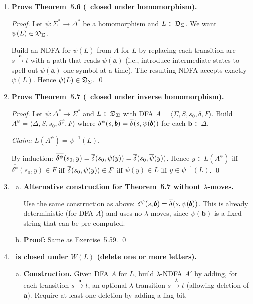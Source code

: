 \begin{enumerate}[{5.}1. ]
\item \textbf{Prove Theorem~5.6 (\DSIG\ closed under homomorphism).}

\begin{proof}
Let $\psi:\Sigma^*\to\Delta^*$ be a homomorphism and $L\in\mathfrak{D}_\Sigma$.  We want $\psi(L)\in\mathfrak{D}_\Sigma$.

Build an NDFA for $\psi(L)$ from $A$ for $L$ by replacing each transition arc $s\xrightarrow{\pmb{a}}t$ with a path that reads $\psi(\pmb{a})$ (i.e., introduce intermediate states to spell out $\psi(\pmb{a})$ one symbol at a time).  The resulting NDFA accepts exactly $\psi(L)$.  Hence $\psi(L)\in\mathfrak{D}_\Sigma$. \qed
\end{proof}

\item \textbf{Prove Theorem~5.7 (\DSIG\ closed under inverse homomorphism).}

\begin{proof}
Let $\psi:\Delta^*\to\Sigma^*$ and $L\in\mathfrak{D}_\Sigma$ with DFA $A=\langle\Sigma,S,s_0,\delta,F\rangle$.
Build $A^\psi=\langle\Delta,S,s_0,\delta^\psi,F\rangle$ where
$\delta^\psi(s,\pmb{b})=\overline{\delta^{}}(s,\psi(\pmb{b}))$ for each $\pmb{b}\in\Delta$.

\emph{Claim:} $L(A^\psi)=\psi^{-1}(L)$.

By induction: $\overline{\delta^\psi}(s_0,y)=\overline{\delta^{}}(s_0,\psi(y))=\overline{\delta^{}}(s_0,\overline{\psi}(y))$.
Hence $y\in L(A^\psi)$ iff $\overline{\delta^\psi}(s_0,y)\in F$ iff $\overline{\delta^{}}(s_0,\psi(y))\in F$ iff $\psi(y)\in L$ iff $y\in\psi^{-1}(L)$. \qed
\end{proof}

\item \begin{enumerate}[(a)]
  \item \textbf{Alternative construction for Theorem~5.7 without $\lambda$-moves.}

  Use the same construction as above: $\delta^\psi(s,\pmb{b})=\overline{\delta^{}}(s,\psi(\pmb{b}))$.  This is already deterministic (for DFA $A$) and uses no $\lambda$-moves, since $\psi(\pmb{b})$ is a fixed string that can be pre-computed.

  \item \textbf{Proof:}  Same as Exercise~5.59. \qed
\end{enumerate}

\item \textbf{\DSIG\ is closed under $W(L)$ (delete one or more letters).}

\begin{enumerate}[(a)]
  \item \textbf{Construction.}  Given DFA $A$ for $L$, build $\lambda$-NDFA $A'$ by adding, for each transition $s\xrightarrow{\pmb{a}}t$, an optional $\lambda$-transition $s\xrightarrow{\lambda}t$ (allowing deletion of $\pmb{a}$).  Require at least one deletion by adding a flag bit.


\end{enumerate}
\end{enumerate}
